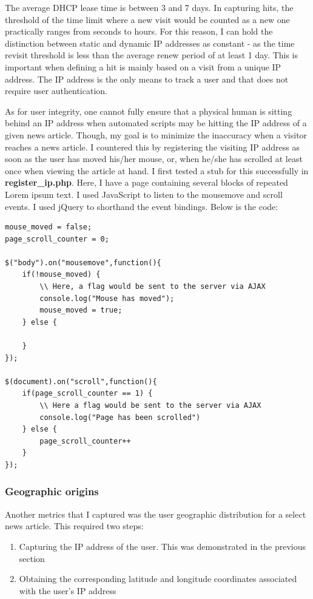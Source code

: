 \documentclass[12pt]{article}
\begin{document}
The average DHCP lease time is between 3 and 7 days. In capturing hits, the threshold of the time limit where a new visit would be counted as a new one practically ranges from seconds to hours. For this reason, I can hold the distinction between static and dynamic IP addresses as constant - as the time revisit threshold is less than the average renew period of at least 1 day. This is important when defining a hit is mainly based on a visit from a unique IP address. The IP address is the only means to track a user and that does not require user authentication. 

As for user integrity, one cannot fully ensure that a physical human is sitting behind an IP address when automated scripts may be hitting the IP address of a given news article. Though, my goal is to minimize the inaccuracy when a visitor reaches a news article. I countered this by registering the visiting IP address as soon as the user has moved his/her mouse, or, when he/she has scrolled at least once when viewing the article at hand. I first tested a stub for this successfully in \textbf{register\_ip.php}. Here, I have a page containing several blocks of repeated Lorem ipsum text. I used JavaScript to listen to the mousemove and scroll events. I used jQuery to shorthand the event bindings. Below is the code:
\begin{lstlisting}[basicstyle=\scriptsize]
mouse_moved = false;
page_scroll_counter = 0;

$("body").on("mousemove",function(){
	if(!mouse_moved) {
		\\ Here, a flag would be sent to the server via AJAX
		console.log("Mouse has moved");
		mouse_moved = true;
	} else {
		
	}
});

$(document).on("scroll",function(){
	if(page_scroll_counter == 1) {
		\\ Here a flag would be sent to the server via AJAX
		console.log("Page has been scrolled")
	} else {
		page_scroll_counter++
	}
});
\end{lstlisting}        

\newpage

\subsubsection{Geographic origins}
Another metrics that I captured was the user geographic distribution for a select news article. This required two steps:
\begin{enumerate}
\item Capturing the IP address of the user. This was demonstrated in the previous section
\item Obtaining the corresponding latitude and longitude coordinates associated with the user's IP address
\end{enumerate}
\end{document}
